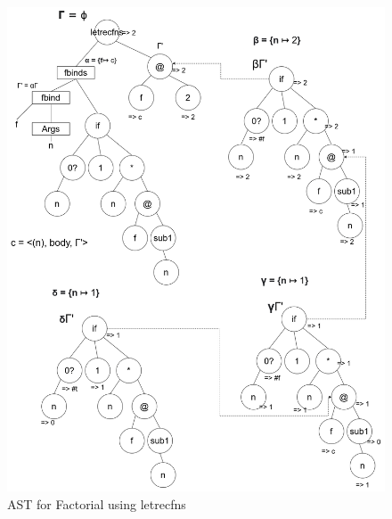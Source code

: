     \begin{figure}[htbp]
        \center
        \includegraphics[scale=0.35]{images/lecture11/recursive_factorial.png}
        \caption{AST for Factorial using letrecfns}
    \end{figure}